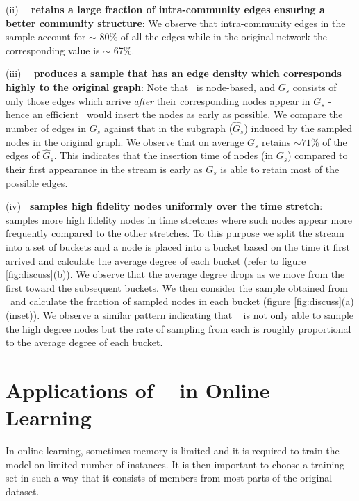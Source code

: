 (ii) \textbf{\compas~ retains a large fraction of intra-community edges ensuring a better community structure}:  We observe that intra-community edges in the sample account for $\sim$ 80\% of all the edges while in the original network the corresponding value is $\sim$ 67\%. 

(iii) \textbf{\compas~ produces a sample that has an edge density which corresponds highly to the original graph}: Note that \compas~is node-based, 
and $G_s$ consists of only those edges which
arrive {\em after} their corresponding nodes appear in $G_s$ - hence an efficient \compas~would 
insert the nodes  as early as possible. We compare the number of edges in $G_s$ against that in the subgraph ($\hat{G}_s$) induced by the sampled nodes in the original graph.
We observe that on average $G_s$ retains $\sim71$\% of the edges of $\hat{G}_s$. 
This indicates that the insertion time of nodes (in $G_s$) compared to their first 
appearance in the stream is early as $G_s$ is 
 able to retain most of the possible edges. 
 
(iv) \textbf{\compas~samples high fidelity nodes uniformly over the time stretch}:
\compas~ samples more high fidelity nodes in time stretches where such nodes appear more frequently compared to the other stretches. To this purpose we split the stream into a set of buckets and a node is placed into a bucket based on the time it first arrived and 
calculate the average degree of each bucket (refer to figure \ref{fig:discuss}(b)). We observe that the average degree drops as we move from the first toward the subsequent buckets. We then consider the sample obtained from \compas~and calculate the fraction of sampled nodes in each bucket (figure \ref{fig:discuss}(a)(inset)). We observe a similar pattern indicating that \compas~ is not only able to sample the high degree nodes but the rate of sampling from each is roughly proportional to the average degree of each bucket.


\section{Applications of \compas~ in Online Learning}
In online learning, sometimes memory is limited and it is required to train the model on limited number of instances. It is then important to choose a training set in such a way that it consists of members from most parts of the original dataset.

